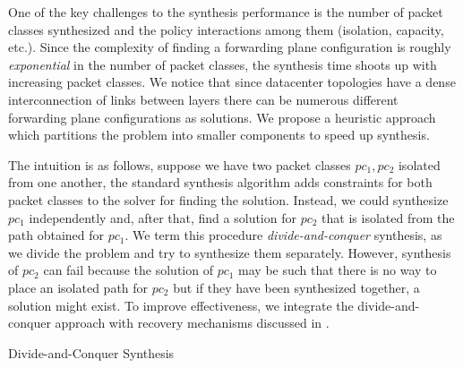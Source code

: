 One of the key challenges to the synthesis performance is the number
of packet classes synthesized and the policy interactions among them
(isolation, capacity, etc.). Since the complexity of finding a
forwarding plane configuration is roughly \emph{exponential} in the
number of packet classes, the synthesis time shoots up with increasing
packet classes. 
We notice that since datacenter topologies have a dense interconnection of
links between layers there can be
numerous different forwarding plane configurations as solutions.
We propose a heuristic approach which partitions the problem 
into smaller components to speed up synthesis.

The intuition is as follows, suppose we have two packet classes $pc_1,
pc_2$ isolated from one another, the standard synthesis algorithm adds 
constraints for both packet classes to the solver for finding the solution.
Instead, we could synthesize $pc_1$
independently and, after that, find a solution for $pc_2$ 
that is isolated from the
path obtained for $pc_1$. We term this
procedure \emph{divide-and-conquer} synthesis, as we divide
the problem and try to synthesize them separately.
However, synthesis of $pc_2$ can fail because the solution
of $pc_1$ may be such that there is no way to place an isolated path for
$pc_2$ but if they have been synthesized together, a
solution might exist. To improve effectiveness, we integrate the 
divide-and-conquer approach with recovery 
mechanisms discussed in .

\begin{algorithm}[h]

	\caption{Divide-and-Conquer Synthesis}
	\label{dcsyn}
	\begin{algorithmic}[1]
		\Else
		  \EndIf
		 \label{lst:line:solrecstart}
		  \EndIf
		\Else
		\EndIf
		\EndWhile \label{lst:line:solrecend}
		\EndIf
		\EndProcedure
	\end{algorithmic}

\end{algorithm}

